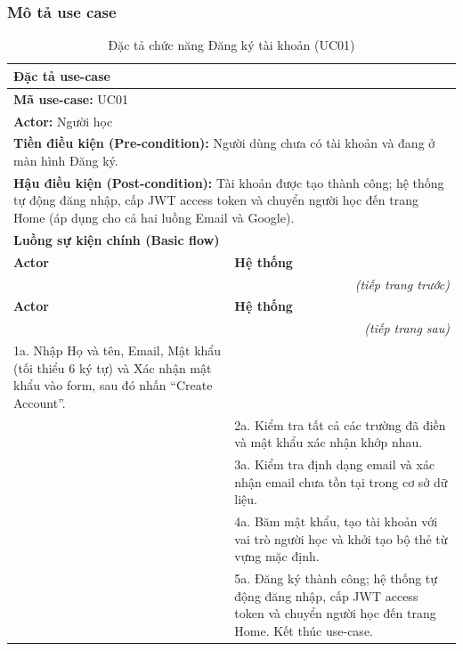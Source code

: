 \subsubsection{Mô tả use case}
\renewcommand{\arraystretch}{1.3}
\setlength{\tbu}{\dimexpr(\linewidth - 4\tabcolsep - 3\arrayrulewidth)/2\relax}
\begin{longtable}{|p{\tbu}|p{\tbu}|}
    \caption{Đặc tả chức năng Đăng ký tài khoản (UC01)} \label{tab:uc01_spec} \\
    
    \hline
    \multicolumn{2}{|l|}{\textbf{Đặc tả use-case}} \\ \hline
    \multicolumn{2}{|l|}{\textbf{Mã use-case:} UC01} \\ \hline
    \multicolumn{2}{|l|}{\textbf{Actor:} Người học} \\ \hline
    \multicolumn{2}{|p{\dimexpr\linewidth-2\tabcolsep-2\arrayrulewidth\relax}|}{\textbf{Tiền điều kiện (Pre-condition):} Người dùng chưa có tài khoản và đang ở màn hình Đăng ký.} \\ \hline
    \multicolumn{2}{|p{\dimexpr\linewidth-2\tabcolsep-2\arrayrulewidth\relax}|}{\textbf{Hậu điều kiện (Post-condition):} Tài khoản được tạo thành công; hệ thống tự động đăng nhập, cấp JWT access token và chuyển người học đến trang Home (áp dụng cho cả hai luồng Email và Google).} \\ \hline
    \multicolumn{2}{|l|}{\textbf{Luồng sự kiện chính (Basic flow)}} \\ \hline
    \textbf{Actor} & \textbf{Hệ thống} \\ \hline
    \endfirsthead
    \multicolumn{2}{r}{\textit{(tiếp trang trước)}} \\
    \hline
    \textbf{Actor} & \textbf{Hệ thống} \\ \hline
    \endhead
    \hline
    \multicolumn{2}{r}{\textit{(tiếp trang sau)}} \\
    \endfoot
    \endlastfoot
    1a. Nhập Họ và tên, Email, Mật khẩu (tối thiểu 6 ký tự) và Xác nhận mật khẩu vào form, sau đó nhấn ``Create Account''. & \\ \hline
    & 2a. Kiểm tra tất cả các trường đã điền và mật khẩu xác nhận khớp nhau. \\ \hline
    & 3a. Kiểm tra định dạng email và xác nhận email chưa tồn tại trong cơ sở dữ liệu. \\ \hline
    & 4a. Băm mật khẩu, tạo tài khoản với vai trò người học và khởi tạo bộ thẻ từ vựng mặc định. \\ \hline
    & 5a. Đăng ký thành công; hệ thống tự động đăng nhập, cấp JWT access token và chuyển người học đến trang Home. Kết thúc use-case. \\ \hline

\end{longtable}
